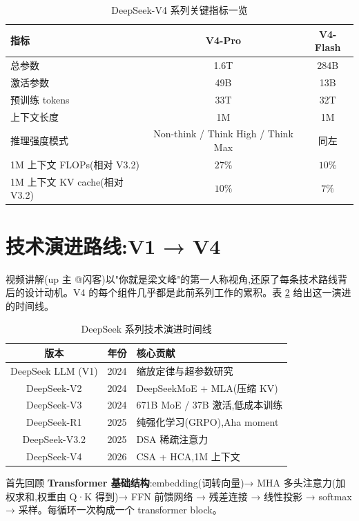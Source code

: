 \documentclass{MathNoteCN}
\begin{document}
\begin{table}[h]
\centering
\caption{DeepSeek-V4 系列关键指标一览\cite{arxiv}}
\label{tab:keymetrics}
\begin{tabular}{lcc}
\hline
指标 & V4-Pro & V4-Flash \\
\hline
总参数 & 1.6T & 284B \\
激活参数 & 49B & 13B \\
预训练 tokens & 33T & 32T \\
上下文长度 & 1M & 1M \\
推理强度模式 & Non-think / Think High / Think Max & 同左 \\
1M 上下文 FLOPs(相对 V3.2) & $27\%$ & $10\%$ \\
1M 上下文 KV cache(相对 V3.2) & $10\%$ & $7\%$ \\
\hline
\end{tabular}
\end{table}

\section{技术演进路线:V1 → V4}

视频讲解\cite{video}(up 主 @闪客)以"你就是梁文峰"的第一人称视角,还原了每条技术路线背后的设计动机。V4 的每个组件几乎都是此前系列工作的累积。表 \ref{tab:timeline} 给出这一演进的时间线。

\begin{table}[h]
\centering
\caption{DeepSeek 系列技术演进时间线}
\label{tab:timeline}
\begin{tabular}{clp{8cm}}
\hline
版本 & 年份 & 核心贡献 \\
\hline
DeepSeek LLM (V1) & 2024 & 缩放定律与超参数研究 \\
DeepSeek-V2 & 2024 & DeepSeekMoE + MLA(压缩 KV) \\
DeepSeek-V3 & 2024 & 671B MoE / 37B 激活,低成本训练 \\
DeepSeek-R1 & 2025 & 纯强化学习(GRPO),Aha moment \\
DeepSeek-V3.2 & 2025 & DSA 稀疏注意力 \\
DeepSeek-V4 & 2026 & CSA + HCA,1M 上下文 \\
\hline
\end{tabular}
\end{table}

首先回顾 \textbf{Transformer 基础结构}\cite{arxiv}:embedding(词转向量)→ MHA 多头注意力(加权求和,权重由 Q·K 得到)→ FFN 前馈网络 → 残差连接 → 线性投影 → softmax → 采样。每循环一次构成一个 transformer block。
\end{document}
